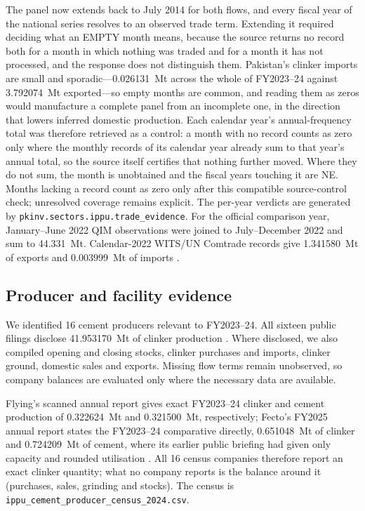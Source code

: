 The panel now extends back to July 2014 for both flows, and every fiscal year of the
national series resolves to an observed trade term. Extending it required deciding what an
EMPTY month means, because the source returns no record both for a month in which nothing
was traded and for a month it has not processed, and the response does not distinguish
them. Pakistan's clinker imports are small and sporadic---\SI{0.026131}{\mega\tonne}
across the whole of FY2023--24 against \SI{3.792074}{\mega\tonne} exported---so empty
months are
common, and reading them as zeros would manufacture a complete panel from an incomplete
one, in the direction that lowers inferred domestic production. Each calendar year's
annual-frequency total was therefore retrieved as a control: a month with no record counts
as zero only where the monthly records of its calendar year already sum to that year's
annual total, so the source itself certifies that nothing further moved. Where they do not
sum, the month is unobtained and the fiscal years touching it are NE. Months lacking a record count as zero only after this compatible source-control check; unresolved coverage remains explicit. The
per-year verdicts are generated by \texttt{pkinv.sectors.ippu.trade\_evidence}. For the official
comparison year, January--June 2022 QIM observations were joined to July--December 2022 and
sum to \SI{44.331}{\mega\tonne}. Calendar-2022 WITS/UN Comtrade records give
\SI{1.341580}{\mega\tonne} of exports and \SI{0.003999}{\mega\tonne} of imports
\citep{witsclinker2022}.

\subsection{Producer and facility evidence}

We identified 16 cement producers relevant to FY2023--24. All sixteen public filings disclose
\SI{41.953170}{\mega\tonne} of clinker production
\citep{luckycement2024,dgkcement2024,attockcement2024,powercement2024,
cheratcement2024,pioneercement2024,thattacement2024,bestwaycement2024,
kohatcement2024,dandotcement2024,gharibwalcement2024,dewancement2025,
faujicement2024,mapleleafcement2024,flyingcement2024}.
Where disclosed, we also compiled opening and closing stocks, clinker purchases and imports,
clinker ground, domestic sales and exports. Missing flow terms remain unobserved, so company
balances are evaluated only where the necessary data are available.

Flying's scanned annual report gives exact FY2023--24 clinker and cement production of
\SI{0.322624}{\mega\tonne} and \SI{0.321500}{\mega\tonne}, respectively; Fecto's FY2025
annual report states the FY2023--24 comparative directly, \SI{0.651048}{\mega\tonne} of
clinker and \SI{0.724209}{\mega\tonne} of cement, where its earlier public briefing had
given only capacity and rounded utilisation
\citep{fectocement2024,fectocement2025,flyingcement2024}. All \num{16} census companies
therefore report an exact clinker quantity; what no company reports is the balance
around it (purchases, sales, grinding and stocks). The census is
\texttt{ippu\_cement\_producer\_census\_2024.csv}.

